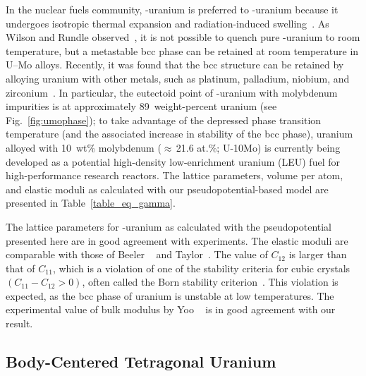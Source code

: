 In the nuclear fuels community, \textgamma-uranium is preferred to
\textalpha-uranium because it undergoes isotropic thermal expansion
and radiation-induced swelling~\cite{kittel1993history}. 
As Wilson and Rundle observed~\cite{wilson1949structures},
it is not possible to quench pure \textgamma-uranium to room
temperature, but a metastable bcc phase can be retained at room temperature
in U--Mo alloys.
Recently, it was found that the bcc structure can be retained by alloying
uranium with other metals, such as platinum, palladium, niobium, and
zirconium~\cite{kim2016superconductivity}.
In particular, the eutectoid point of \textgamma-uranium with molybdenum
impurities is at approximately 89~weight-percent uranium (see Fig.~\ref{fig:umophase}); to take advantage of
the depressed phase transition temperature (and the associated increase in
stability of the bcc phase), uranium alloyed with 10~wt\% molybdenum
($\approx$\,21.6 at.\%; U-10Mo) is currently being developed as a potential
high-density low-enrichment uranium (LEU) fuel for high-performance research
reactors. The lattice parameters, volume per atom, and elastic moduli as
calculated with our pseudopotential-based model are presented in
Table~\ref{table_eq_gamma}.

The lattice parameters for \textgamma-uranium as calculated with the
pseudopotential presented here are in good agreement with experiments.
The elastic moduli are comparable with those of
Beeler \etal~\cite{beeler2013first} and Taylor~\cite{taylor2008evaluation}.
The value of $C_{12}$ is larger than that of $C_{11}$, which is
a violation of one of the stability criteria for cubic crystals
$(C_{11}-C_{12} > 0)$, often called the Born stability
criterion~\cite{born1940stability,born1954dynamical,Mouhat2014}. This violation
is expected, as the bcc phase of uranium is unstable at low temperatures. The
experimental value of bulk modulus by Yoo \etal~\cite{yoo1998phase} is in good
agreement with our result.

\subsection{Body-Centered Tetragonal Uranium}
\label{subsec_bct}

